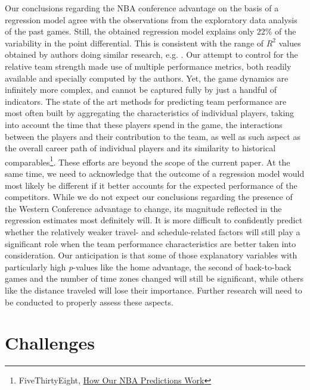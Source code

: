 \documentclass[
    12pt,
    a4paper,
    titlepage,  %
    abstract,  %
    headings=standardclasses,  %
    bibliography=totocnumbered  %
]{scrartcl}
\begin{document}
Our conclusions regarding the NBA conference advantage on the basis of a regression model agree with the observations from the exploratory data analysis of the past games. Still, the obtained regression model explains only 22\% of the variability in the point differential. This is consistent with the range of $R^2$ values obtained by authors doing similar research, e.g. \cite{carr}. Our attempt to control for the relative team strength made use of multiple performance metrics, both readily available and specially computed by the authors. Yet, the game dynamics are infinitely more complex, and cannot be captured fully by just a handful of indicators. The state of the art methods for predicting team performance are most often built by aggregating the characteristics of individual players, taking into account the time that these players spend in the game, the interactions between the players and their contribution to the team, as well as such aspect as the overall career path of individual players and its similarity to historical comparables\footnote{FiveThirtyEight, \href{https://fivethirtyeight.com/methodology/how-our-nba-predictions-work/}{How Our NBA Predictions Work}}. These efforts are beyond the scope of the current paper. At the same time, we need to acknowledge that the outcome of a regression model would most likely be different if it better accounts for the expected performance of the competitors. While we do not expect our conclusions regarding the presence of the Western Conference advantage to change, its magnitude reflected in the regression estimates most definitely will. It is more difficult to confidently predict whether the relatively weaker travel- and schedule-related factors will still play a significant role when the team performance characteristics are better taken into consideration. Our anticipation is that some of those explanatory variables with particularly high \emph{p}-values like the home advantage, the second of back-to-back games and the number of time zones changed will still be significant, while others like the distance traveled will lose their importance. Further research will need to be conducted to properly assess these aspects.

\section{Challenges}
\end{document}
